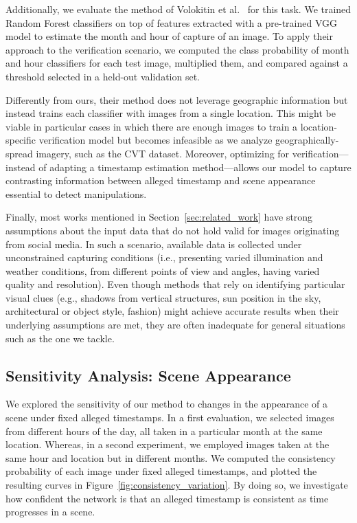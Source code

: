\documentclass[journal]{IEEEtran}
\begin{document}
        Additionally, we evaluate the method of Volokitin et al.~\cite{volokitin2016deep} for this task. We trained Random Forest classifiers on top of features extracted with a pre-trained VGG model to estimate the month and hour of capture of an image. To apply their approach to the verification scenario, we computed the class probability of month and hour classifiers for each test image, multiplied them, and compared against a threshold selected in a held-out validation set.
        
        Differently from ours, their method does not leverage geographic information but instead trains each classifier with images from a single location. This might be viable in particular cases in which there are enough images to train a location-specific verification model but becomes infeasible as we analyze geographically-spread imagery, such as the CVT dataset. Moreover, optimizing for verification---instead of adapting a timestamp estimation method---allows our model to capture contrasting information between alleged timestamp and scene appearance essential to detect manipulations.
        
        Finally, most works mentioned in Section~\ref{sec:related_work} have strong assumptions about the input data that do not hold valid for images originating from social media. In such a scenario, available data is collected under unconstrained capturing conditions (i.e., presenting varied illumination and weather conditions, from different points of view and angles, having varied quality and resolution). Even though methods that rely on identifying particular visual clues (e.g., shadows from vertical structures, sun position in the sky, architectural or object style, fashion) might achieve accurate results when their underlying assumptions are met, they are often inadequate for general situations such as the one we tackle.
        


        
        
    \subsection{Sensitivity Analysis: Scene Appearance}\label{sec:sensitivity_image}
        We explored the sensitivity of our method to changes in the appearance of a scene under fixed alleged timestamps. In a first evaluation, we selected images from different hours of the day, all taken in a particular month at the same location. Whereas, in a second experiment, we employed images taken at the same hour and location but in different months. We computed the consistency probability of each image under fixed alleged timestamps, and plotted the resulting curves in Figure~\ref{fig:consistency_variation}. By doing so, we investigate how confident the network is that an alleged timestamp is consistent as time progresses in a scene.
        
\end{document}
